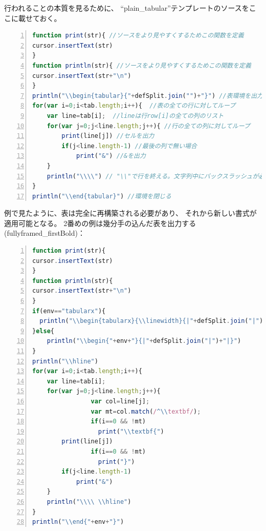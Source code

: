 行われることの本質を見るために、
``plain\_tabular''テンプレートのソースをここに載せておく。

\begin{lstlisting}[frame=single,language=JavaScript,breaklines=true,numbers=left]
function print(str){ //ソースをより見やすくするためこの関数を定義
cursor.insertText(str)
}
function println(str){ //ソースをより見やすくするためこの関数を定義
cursor.insertText(str+"\n")
}
println("\\begin{tabular}{"+defSplit.join("")+"}") //表環境を出力
for(var i=0;i<tab.length;i++){  //表の全ての行に対してループ
    var line=tab[i];  //lineは行row[i]の全ての列のリスト
    for(var j=0;j<line.length;j++){ //行の全ての列に対してループ
        print(line[j]) //セルを出力
        if(j<line.length-1) //最後の列で無い場合
            print("&") //&を出力
    }
    println("\\\\") // "\\"で行を終える。文字列中にバックスラッシュが必要なことに注意。
}
println("\\end{tabular}") //環境を閉じる
\end{lstlisting}

例で見たように、表は完全に再構築される必要があり、
それから新しい書式が適用可能となる。
2番めの例は幾分手の込んだ表を出力する(fullyframed\_firstBold)：

\begin{lstlisting}[frame=single,language=JavaScript,breaklines=true,numbers=left]
function print(str){
cursor.insertText(str)
}
function println(str){
cursor.insertText(str+"\n")
}
if(env=="tabularx"){
  println("\\begin{tabularx}{\\linewidth}{|"+defSplit.join("|")+"|}")
}else{
    println("\\begin{"+env+"}{|"+defSplit.join("|")+"|}")
}
println("\\hline")
for(var i=0;i<tab.length;i++){
    var line=tab[i];
    for(var j=0;j<line.length;j++){
                var col=line[j];
                var mt=col.match(/^\\textbf/);
                if(i==0 && !mt)
                  print("\\textbf{")
        print(line[j])
                if(i==0 && !mt)
                  print("}")
        if(j<line.length-1)
            print("&")
    }
    println("\\\\ \\hline")
}
println("\\end{"+env+"}")
\end{lstlisting}
